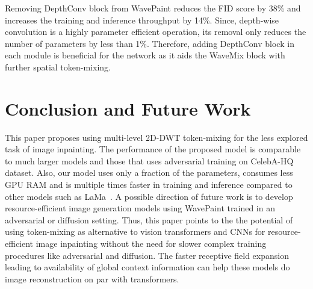 \documentclass{article}
\begin{document}
Removing DepthConv block from WavePaint reduces the FID score by 38\% and increases the training and inference throughput by 14\%. Since, depth-wise convolution is a highly parameter efficient operation, its removal only reduces the number of parameters by less than 1\%. Therefore, adding DepthConv block in each module is beneficial for the network as it aids the WaveMix block with further spatial token-mixing. 








\section{Conclusion and Future Work}

This paper proposes using multi-level 2D-DWT token-mixing for the less explored task of image inpainting. The performance of the proposed model is comparable to much larger models and those that uses adversarial training on CelebA-HQ dataset. Also, our model uses only a fraction of the parameters, consumes less GPU RAM and is multiple times faster in training and inference compared to other models such as LaMa~\cite{Lama_2021}. A possible direction of future work is to develop resource-efficient image generation models using WavePaint trained in an adversarial or diffusion setting. Thus, this paper points to the the potential of using token-mixing as alternative to vision transformers and CNNs for resource-efficient image inpainting without the need for slower complex training procedures like adversarial and diffusion. The faster receptive field expansion leading to availability of global context information can help these models do image reconstruction on par with transformers. 



  
  
\end{document}
